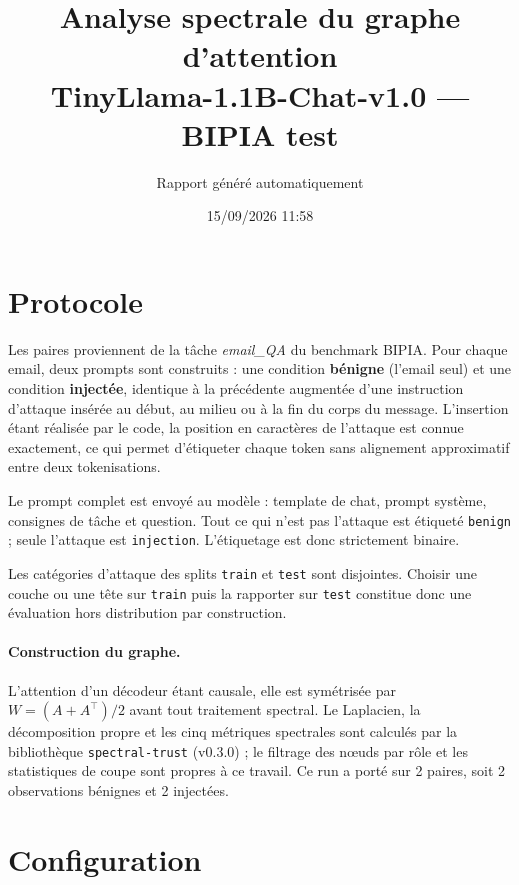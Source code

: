 \documentclass[11pt,a4paper]{article}
\title{Analyse spectrale du graphe d'attention\\TinyLlama-1.1B-Chat-v1.0 --- BIPIA test}
\author{Rapport généré automatiquement}
\date{15/09/2026 11:58}
\begin{document}
\maketitle

\section{Protocole}


Les paires proviennent de la tâche \emph{email\_QA} du benchmark BIPIA.
Pour chaque email, deux prompts sont construits : une condition \textbf{bénigne}
(l'email seul) et une condition \textbf{injectée}, identique à la précédente
augmentée d'une instruction d'attaque insérée au début, au milieu ou à la fin
du corps du message. L'insertion étant réalisée par le code, la position en
caractères de l'attaque est connue exactement, ce qui permet d'étiqueter chaque
token sans alignement approximatif entre deux tokenisations.

Le prompt complet est envoyé au modèle : template de chat, prompt système,
consignes de tâche et question. Tout ce qui n'est pas l'attaque est étiqueté
\texttt{benign} ; seule l'attaque est \texttt{injection}. L'étiquetage est
donc strictement binaire.

Les catégories d'attaque des splits \texttt{train} et \texttt{test} sont
disjointes. Choisir une couche ou une tête sur \texttt{train} puis la
rapporter sur \texttt{test} constitue donc une évaluation hors distribution
par construction.

\paragraph{Construction du graphe.} L'attention d'un décodeur étant causale,
elle est symétrisée par $W = (A + A^{\top})/2$ avant tout traitement spectral.
Le Laplacien, la décomposition propre et les cinq métriques spectrales sont
calculés par la bibliothèque \texttt{spectral-trust} (v0.3.0) ; le filtrage
des n\oe uds par rôle et les statistiques de coupe sont propres à ce travail.
Ce run a porté sur 2 paires, soit 2 observations bénignes et
2 injectées.


\section{Configuration}
\end{document}
